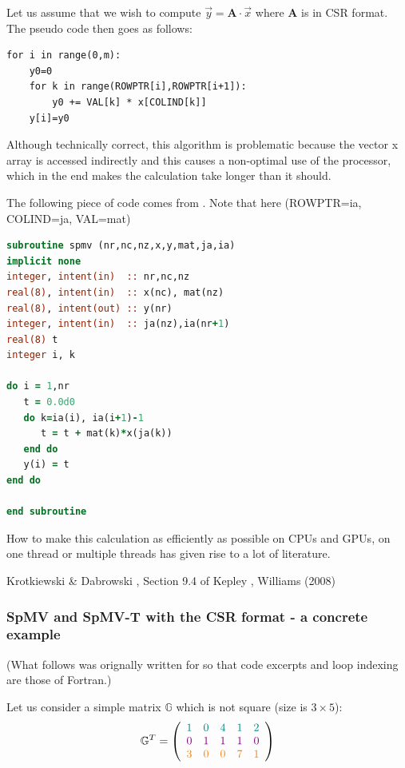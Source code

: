 Let us assume that we wish to compute $\vec{y}={\bm A}\cdot \vec{x}$ where ${\bm A}$ 
is in CSR format. The pseudo code then goes as follows:
\begin{verbatim}
for i in range(0,m):
    y0=0
    for k in range(ROWPTR[i],ROWPTR[i+1]):
        y0 += VAL[k] * x[COLIND[k]]
    y[i]=y0
\end{verbatim} 
Although technically correct, this algorithm is problematic because the vector x array
is accessed indirectly and this causes a non-optimal use of the processor, which 
in the end makes the calculation take longer than it should.


The following piece of code comes from \elefant. Note that here (ROWPTR=ia, COLIND=ja, VAL=mat)
\begin{lstlisting}[language=Fortran]
subroutine spmv (nr,nc,nz,x,y,mat,ja,ia)
implicit none
integer, intent(in)  :: nr,nc,nz
real(8), intent(in)  :: x(nc), mat(nz)
real(8), intent(out) :: y(nr)
integer, intent(in)  :: ja(nz),ia(nr+1)
real(8) t
integer i, k

do i = 1,nr
   t = 0.0d0
   do k=ia(i), ia(i+1)-1
      t = t + mat(k)*x(ja(k))
   end do
   y(i) = t 
end do

end subroutine
\end{lstlisting}


How to make this calculation as efficiently as possible on CPUs and GPUs, on one thread 
or multiple threads has given rise to a lot of literature.

\Literature Krotkiewski \& Dabrowski \cite{krda10}, Section 9.4 of Kepley \cite{knepley}, 
Williams \etal (2008) \cite{widc08}

\subsubsection{SpMV and SpMV-T with the CSR format - a concrete example}

(What follows was orignally written for \elefant so that code excerpts and loop indexing 
are those of Fortran.)

Let us consider a simple matrix $\mathbb{G}$ which is not square (size is $3\times5$):
\[
{\mathbb{G}}^T=
\left(
\begin{array}{ccccc}
{\color{teal} 1} & {\color{teal}0}& {\color{teal}4}& {\color{teal}1}& {\color{teal}2}\\
{\color{violet}0}& {\color{violet}1}& {\color{violet}1}& {\color{violet}1}& {\color{violet}0}\\
{\color{orange}3}& {\color{orange}0} & {\color{orange}0}& {\color{orange}7}& {\color{orange}1}
\end{array}
\right)
\]

